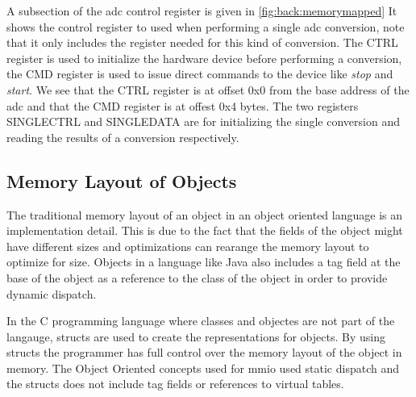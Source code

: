 A subsection of the \gls{adc} control register is given in \autoref{fig:back:memorymapped}
It shows the control register to used when performing a single \gls{adc} conversion, note that it only includes the register needed for this kind of conversion.
The CTRL register is used to initialize the hardware device before performing a conversion, the CMD register is used to issue direct commands to the device like \emph{stop} and \emph{start}.
We see that the CTRL register is at offset 0x0 from the base address of the \gls{adc} and that the CMD register is at offest 0x4 bytes.
The two registers SINGLECTRL and SINGLEDATA are for initializing the single conversion and reading the results of a conversion respectively.

\subsection{Memory Layout of Objects}

The traditional memory layout of an object in an object oriented language is an implementation detail.
This is due to the fact that the fields of the object might have different sizes and optimizations can rearange the memory layout to optimize for size.
Objects in a language like Java also includes a tag field at the base of the object as a reference to the class of the object in order to provide dynamic dispatch.

In the C programming language where classes and objectes are not part of the langauge, structs are used to create the representations for objects.
By using structs the programmer has full control over the memory layout of the object in memory.
The Object Oriented concepts used for \gls{mmio} used static dispatch and the structs does not include tag fields or references to virtual tables.

